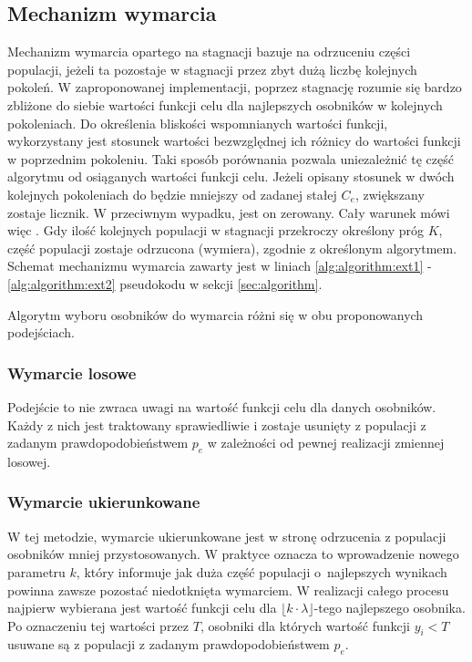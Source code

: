 \documentclass[10pt]{article}
\begin{document}
\subsection{Mechanizm wymarcia}
Mechanizm wymarcia opartego na stagnacji bazuje na odrzuceniu części populacji, jeżeli ta pozostaje w stagnacji przez zbyt dużą liczbę kolejnych pokoleń. W zaproponowanej implementacji, poprzez stagnację rozumie się bardzo zbliżone do siebie wartości funkcji celu dla najlepszych osobników w kolejnych pokoleniach. Do określenia bliskości wspomnianych wartości funkcji, wykorzystany jest stosunek wartości bezwzględnej ich różnicy do wartości funkcji w poprzednim pokoleniu. Taki sposób porównania pozwala uniezależnić tę część algorytmu od osiąganych wartości funkcji celu. Jeżeli opisany stosunek w dwóch kolejnych pokoleniach do będzie mniejszy od zadanej stałej $C_e$, zwiększany zostaje licznik. W przeciwnym wypadku, jest on zerowany. Cały warunek mówi więc . Gdy ilość kolejnych populacji w stagnacji przekroczy określony próg $K$, część populacji zostaje odrzucona (wymiera), zgodnie z określonym algorytmem. Schemat mechanizmu wymarcia zawarty jest w liniach \ref{alg:algorithm:ext1} - \ref{alg:algorithm:ext2} pseudokodu w sekcji \ref{sec:algorithm}.

Algorytm wyboru osobników do wymarcia różni się w obu proponowanych podejściach.
\subsubsection{Wymarcie losowe}
Podejście to nie zwraca uwagi na wartość funkcji celu dla danych osobników. Każdy z nich jest traktowany sprawiedliwie i zostaje usunięty z populacji z zadanym prawdopodobieństwem $p_e$ w zależności od pewnej realizacji zmiennej losowej.

\subsubsection{Wymarcie ukierunkowane}
W tej metodzie, wymarcie ukierunkowane jest w stronę odrzucenia z populacji osobników mniej przystosowanych. W praktyce oznacza to wprowadzenie nowego parametru $k$, który informuje jak duża część populacji o~najlepszych wynikach powinna zawsze pozostać niedotknięta wymarciem. W realizacji całego procesu najpierw wybierana jest wartość funkcji celu dla $\lfloor k \cdot \lambda \rfloor$-tego najlepszego osobnika. Po oznaczeniu tej wartości przez $T$, osobniki dla których wartość funkcji $y_i < T$ usuwane są z populacji z zadanym prawdopodobieństwem $p_e$.
\end{document}
